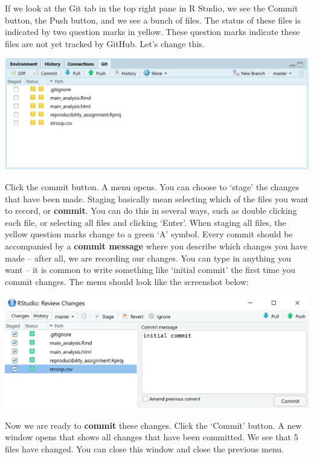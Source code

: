 \documentclass[
  oneside]{book}
\begin{document}
If we look at the Git tab in the top right pane in R Studio, we see the Commit
button, the Push button, and we see a bunch of files. The status of these files
is indicated by two question marks in yellow. These question marks indicate
these files are not yet tracked by GitHub. Let's change this.

\begin{center}\includegraphics[width=1\linewidth]{images/ca36fd42cb6d9189534590e5cfcb9411} \end{center}

Click the commit button. A menu opens. You can choose to `stage' the changes
that have been made. Staging basically mean selecting which of the files you
want to record, or \textbf{commit}. You can do this in several ways, such as double
clicking each file, or selecting all files and clicking `Enter'. When staging
all files, the yellow question marks change to a green `A' symbol. Every commit
should be accompanied by a \textbf{commit message} where you describe which changes
you have made -- after all, we are recording our changes. You can type in
anything you want -- it is common to write something like `initial commit' the
first time you commit changes. The menu should look like the screenshot below:

\begin{center}\includegraphics[width=1\linewidth]{images/df26ee077662dda7148be10da4c410e8} \end{center}

Now we are ready to \textbf{commit} these changes. Click the `Commit' button. A new
window opens that shows all changes that have been committed. We see that 5
files have changed. You can close this window and close the previous menu.
\end{document}
